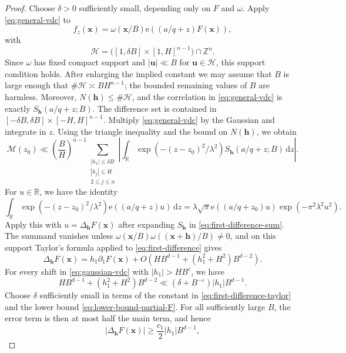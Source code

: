 \documentclass[10pt,a4paper]{amsart}
\newcommand{\RR}{\mathbb R}
\newcommand{\ZZ}{\mathbb Z}
\newcommand{\dint}{\,\mathrm d}
\newcommand{\e}{\mathrm e}
\newcommand{\eps}{\varepsilon}
\newcommand{\h}{\mathbf h}
\newcommand{\x}{\mathbf{x}}
\begin{document}
\begin{proof}
Choose \(\delta>0\) sufficiently small, depending only on \(F\) and \(\omega\).
Apply \eqref{eq:general-vdc} to
\[
 f_z(\x)=\omega(\x/B)\e((a/q+z)F(\x)),
\]
with
\[
\mathcal H=
 \bigl([1,\delta B]\times[1,H]^{n-1}\bigr)\cap\ZZ^n.
\]
Since \(\omega\) has fixed compact support and \(|\mathbf u|\ll B\) for \(\mathbf u\in\mathcal H\), this support condition holds.
After enlarging the implied constant we may assume that \(B\) is large enough that \(\#\mathcal H\asymp BH^{n-1}\); the bounded remaining values of \(B\) are harmless.
Moreover, \(N(\h)\leq\#\mathcal H\), and the correlation in \eqref{eq:general-vdc} is exactly \(S_\h(a/q+z;B)\).
The difference set is contained in \([ -\delta B,\delta B]\times[-H,H]^{n-1}\).
Multiply \eqref{eq:general-vdc} by the Gaussian and integrate in \(z\).
Using the triangle inequality and the bound on \(N(\h)\), we obtain
\begin{equation}\label{eq:gaussian-vdc}
 \mathcal M(z_0)\ll
 \left(\frac BH\right)^{n-1}\!
 \sum_{\substack{|h_1|\leq\delta B\\
                  |h_j|\leq H\\
                  2\leq j\leq n}}
 \left|\int_{\RR}\exp(-(z-z_0)^2/\lambda^2)
 S_{\h}(a/q+z;B)\dint z\right|.
\end{equation}
For \(u\in\RR\), we have the identity
\begin{equation*}
 \int_{\RR}\exp(-(z-z_0)^2/\lambda^2)
 \e((a/q+z)u)\dint z
 =\lambda\sqrt\pi
 \e((a/q+z_0)u)
 \exp(-\pi^2\lambda^2u^2).
\end{equation*}
Apply this with \(u=\Delta_\h F(\x)\) after expanding \(S_{\h}\) in \eqref{eq:first-difference-sum}.
The summand vanishes unless \(\omega(\x/B)\omega((\x+\h)/B)\neq0\), and on this support Taylor's formula applied to \eqref{eq:first-difference} gives
\begin{equation}\label{eq:first-difference-taylor}
 \Delta_\h F(\x)
 =h_1\partial_1F(\x)+O(HB^{d-1} + (h_1^2+H^2)B^{d-2}).
\end{equation}
For every shift in \eqref{eq:gaussian-vdc} with \(|h_1|>HB^\eps\), we have
\begin{equation*}
 HB^{d-1}+(h_1^2+H^2)B^{d-2}
 \ll(\delta+B^{-\eps})|h_1|B^{d-1}.
\end{equation*}
Choose \(\delta\) sufficiently small in terms of the constant in \eqref{eq:first-difference-taylor} and the lower bound \eqref{eq:lower-bound-partial-F}.
For all sufficiently large \(B\), the error term is then at most half the main term, and hence
\[
 |\Delta_\h F(\x)|\geq \frac{c_1}{2}|h_1|B^{d-1},
\]
\end{proof}
\end{document}
